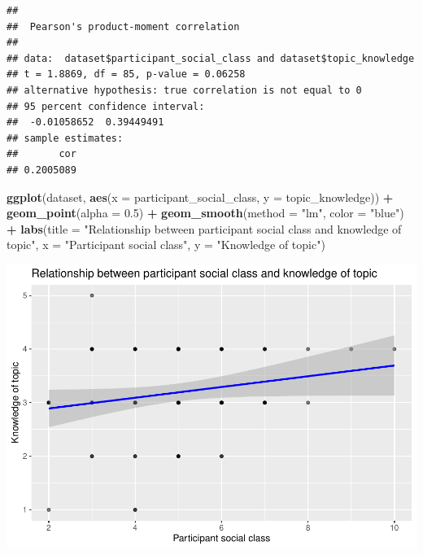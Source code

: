 \documentclass[
  man]{apa6}
\newenvironment{Shaded}{\begin{snugshade}}{\end{snugshade}}
\newcommand{\AttributeTok}[1]{\textcolor[rgb]{0.13,0.29,0.53}{#1}}
\newcommand{\FloatTok}[1]{\textcolor[rgb]{0.00,0.00,0.81}{#1}}
\newcommand{\FunctionTok}[1]{\textcolor[rgb]{0.13,0.29,0.53}{\textbf{#1}}}
\newcommand{\NormalTok}[1]{#1}
\newcommand{\SpecialCharTok}[1]{\textcolor[rgb]{0.81,0.36,0.00}{\textbf{#1}}}
\newcommand{\StringTok}[1]{\textcolor[rgb]{0.31,0.60,0.02}{#1}}
\begin{document}
\begin{Shaded}
\end{Shaded}

\begin{verbatim}
## 
##  Pearson's product-moment correlation
## 
## data:  dataset$participant_social_class and dataset$topic_knowledge
## t = 1.8869, df = 85, p-value = 0.06258
## alternative hypothesis: true correlation is not equal to 0
## 95 percent confidence interval:
##  -0.01058652  0.39449491
## sample estimates:
##       cor 
## 0.2005089
\end{verbatim}

\begin{Shaded}
\begin{Highlighting}[]
\FunctionTok{ggplot}\NormalTok{(dataset, }\FunctionTok{aes}\NormalTok{(}\AttributeTok{x =}\NormalTok{ participant\_social\_class, }\AttributeTok{y =}\NormalTok{ topic\_knowledge)) }\SpecialCharTok{+}
  \FunctionTok{geom\_point}\NormalTok{(}\AttributeTok{alpha =} \FloatTok{0.5}\NormalTok{) }\SpecialCharTok{+}
  \FunctionTok{geom\_smooth}\NormalTok{(}\AttributeTok{method =} \StringTok{"lm"}\NormalTok{, }\AttributeTok{color =} \StringTok{"blue"}\NormalTok{) }\SpecialCharTok{+}
  \FunctionTok{labs}\NormalTok{(}\AttributeTok{title =} \StringTok{"Relationship between participant social class and knowledge of topic"}\NormalTok{,}
       \AttributeTok{x =} \StringTok{"Participant social class"}\NormalTok{,}
       \AttributeTok{y =} \StringTok{"Knowledge of topic"}\NormalTok{)}
\end{Highlighting}
\end{Shaded}

\includegraphics{sooyoun-pilot_files/figure-latex/hypothesis testing-1.pdf}
\end{document}

